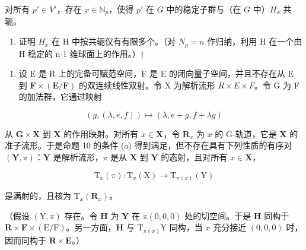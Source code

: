 对所有 \(p' \in V'\)，存在 \(x \in \mathbb{N}_p\)，使得 \(p'\) 在 \(G\) 中的稳定子群与（在 \(G\) 中）\(H_x\) 共轭。

\begin{enumerate}
\def\labelenumi{(\alph{enumi})}
\setcounter{enumi}{4}
\tightlist
\item
  证明 \(H_{x}\) 在 H 中按共轭仅有有限多个。（对 \(N_{p}=n\) 作归纳，利用 H 在一个由 H 稳定的 n-1 维球面上的作用。）†
\end{enumerate}

\begin{enumerate}
\def\labelenumi{\arabic{enumi}.}
\setcounter{enumi}{6}
\tightlist
\item
  设 E 是 R 上的完备可赋范空间，F 是 E 的闭向量子空间，并且不存在从 E 到 \(\mathbf{F} \times (\mathbf{E}/\mathbf{F})\) 的双连续线性双射。令 X 为解析流形 \(R \times E \times F\)。令 G 为 F 的加法群，它通过映射
\end{enumerate}

\[
(g, (\lambda , e, f)) \mapsto (\lambda , e + g, f + \lambda g)
\]

从 \(\mathbf{G} \times \mathbf{X}\) 到 \(\mathbf{X}\) 的作用映射。对所有 \(x \in \mathbf{X}\)，令 \(\mathbf{R}_x\) 为 \(x\) 的 G-轨道，它是 \(\mathbf{X}\) 的准子流形。于是命题 10 的条件 (a) 得到满足，但不存在具有下列性质的有序对 \((\mathbf{Y}, \pi)\)：\(\mathbf{Y}\) 是解析流形，\(\pi\) 是从 \(\mathbf{X}\) 到 \(\mathbf{Y}\) 的态射，且对所有 \(x \in \mathbf{X}\)，

\[
\mathrm{T} _ {x} (\pi): \mathrm{T} _ {x} (\mathrm{X}) \rightarrow \mathrm{T} _ {\pi (x)} (\mathrm{Y})
\]

是满射的，且核为 \(\mathrm{T}_x(\mathbf{R}_x)\)。

（假设 \((\mathrm{Y},\pi)\) 存在。令 \(\mathbf{H}\) 为 \(\mathbf{Y}\) 在 \(\pi (0,0,0)\) 处的切空间。于是 \(\mathbf{H}\) 同构于 \(\mathbf{R}\times \mathbf{F}\times (\mathrm{E} / \mathrm{F})\)。另一方面，\(\mathbf{H}\) 与 \(\mathrm{T}_{\pi (x)}\mathrm{Y}\) 同构，当 \(x\) 充分接近 \((0,0,0)\) 时，因而同构于 \(\mathbf{R}\times \mathbf{E}\)。）

